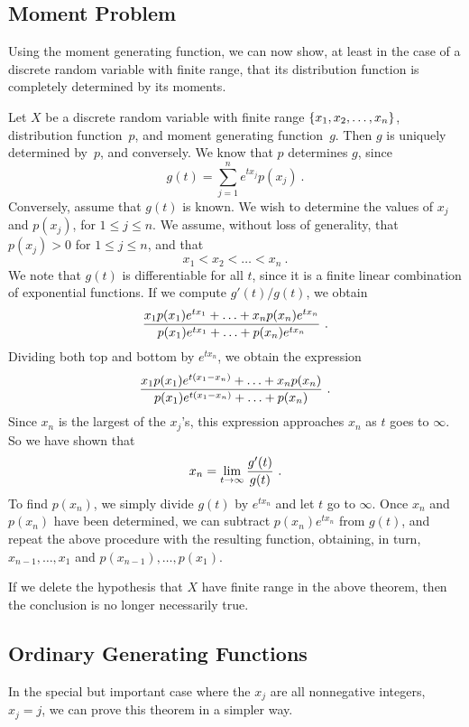 \subsection*{Moment Problem}
Using the moment generating function, we can now show, at least in the case of
a discrete random variable with finite range, that its distribution function is
completely determined by its moments.
\begin{theorem}\label{thm 10.2}
Let $X$ be a discrete random variable with finite range 
$\{x_1,x_2,\ldots,\linebreak x_n\}$, distribution function~$p$, and moment generating
function~$g$.  Then $g$ is uniquely determined by~$p$, and conversely.
\proof
We know that $p$ determines $g$, since
$$
g(t) = \sum_{j = 1}^n e^{tx_j} p(x_j)\ .
$$
Conversely, assume that $g(t)$ is known.  We wish to determine the values of $x_j$ and $p(x_j)$, for $1 \le j \le n$.  We assume, without loss of generality, that $p(x_j) > 0$ for $1 \le j \le n$, and that 
$$x_1 < x_2 < \ldots < x_n\ .$$
We note that $g(t)$ is differentiable for all $t$, since it is a finite linear combination of exponential functions.  If we compute $g'(t)/g(t)$, we obtain
$${{x_1 p(x_1) e^{tx_1} + \ldots + x_n p(x_n) e^{t x_n}}\over{p(x_1) e^{tx_1} + \ldots + p(x_n)e^{tx_n}}}\ .$$
Dividing both top and bottom by $e^{tx_n}$, we obtain the expression
$${{x_1 p(x_1) e^{t(x_1-x_n)} + \ldots + x_n p(x_n)}\over{p(x_1) e^{t(x_1 - x_n)} + \ldots + p(x_n)}}\ .$$
Since $x_n$ is the largest of the $x_j$'s, this expression approaches $x_n$ as $t$ goes to $\infty$. So we have shown that
$$x_n = \lim_{t \rightarrow \infty} {{g'(t)}\over{g(t)}}\ .$$
To find $p(x_n)$, we simply divide $g(t)$ by $e^{tx_n}$ and let $t$ go to $\infty$.
Once $x_n$ and $p(x_n)$ have been determined, we can subtract $p(x_n) e^{tx_n}$ from $g(t)$, and repeat the above procedure with the resulting function, obtaining, in turn, $x_{n-1}, \ldots, x_1$ and $p(x_{n-1}), \ldots, p(x_1)$.
\end{theorem}

If we delete the hypothesis that $X$ have finite range in the above theorem, then
the conclusion is no longer necessarily true.

\subsection*{Ordinary Generating Functions}
In the special but important case where the $x_j$ are all nonnegative integers,
$x_j = j$, we can prove this theorem in a simpler way.

